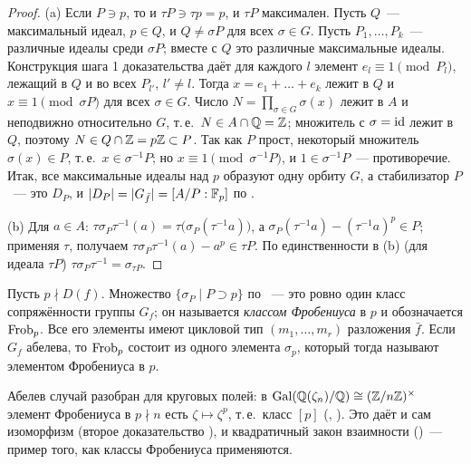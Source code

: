 \begin{proof}
(a) Если $P\ni p$, то и $\tau P\ni\tau p=p$, и $\tau P$ максимален. Пусть $Q$~--- максимальный идеал, $p\in Q$, и
$Q\ne\sigma P$ для всех $\sigma\in G$. Пусть $P_1,\dots,P_k$~--- различные идеалы среди $\sigma P$; вместе с $Q$ это
различные максимальные идеалы. Конструкция шага 1 доказательства  даёт для каждого $l$ элемент $e_l\equiv1\pmod{P_l}$,
лежащий в $Q$ и во всех $P_{l'}$, $l'\ne l$. Тогда $x=e_1+\dots+e_k$ лежит в $Q$ и $x\equiv1\pmod{\sigma P}$ для всех
$\sigma\in G$. Число
$N=\prod_{\sigma\in G}\sigma(x)$ лежит в $A$ и неподвижно относительно $G$, т.\,е.\ $N\in A\cap\mathbb Q=\mathbb Z$; множитель с
$\sigma=\operatorname{id}$ лежит в $Q$, поэтому $N\in Q\cap\mathbb Z=p\mathbb Z\subset P$. Так как $P$ прост, некоторый множитель
$\sigma(x)\in P$, т.\,е.\ $x\in\sigma^{-1}P$; но $x\equiv1\pmod{\sigma^{-1}P}$, и $1\in\sigma^{-1}P$~--- противоречие. Итак,
все максимальные идеалы над $p$ образуют одну орбиту $G$, а стабилизатор $P$~--- это $D_P$, и $|D_P|=|G_{\bar f}|=[A/P:\mathbb F_p]$
по .

(b) Для $a\in A$: $\tau\sigma_P\tau^{-1}(a)=\tau\bigl(\sigma_P(\tau^{-1}a)\bigr)$, а $\sigma_P(\tau^{-1}a)-(\tau^{-1}a)^p\in P$;
применяя $\tau$, получаем $\tau\sigma_P\tau^{-1}(a)-a^p\in\tau P$. По единственности в (b) (для идеала $\tau P$)
$\tau\sigma_P\tau^{-1}=\sigma_{\tau P}$.
\end{proof}

\begin{definition}
Пусть $p\nmid D(f)$. Множество $\{\sigma_P\mid P\supset p\}$ по ~--- это ровно один класс сопряжённости группы $G_f$; он
называется \emph{классом Фробениуса} в $p$ и обозначается $\operatorname{Frob}_p$. Все его элементы имеют цикловой тип
$(m_1,\dots,m_r)$ разложения $\bar f$. Если $G_f$ абелева, то $\operatorname{Frob}_p$ состоит из одного элемента $\sigma_p$, который
тогда называют элементом Фробениуса в $p$.
\end{definition}

Абелев случай разобран для круговых полей: в $\operatorname{Gal}(\mathbb Q(\zeta_n)/\mathbb Q)\cong(\mathbb Z/n\mathbb Z)^\times$ элемент Фробениуса в $p\nmid n$ есть
$\zeta\mapsto\zeta^p$, т.\,е.\ класс $[p]$ (, ). Это даёт и сам изоморфизм (второе доказательство ), и
квадратичный закон взаимности ()~--- пример того, как классы Фробениуса применяются.

